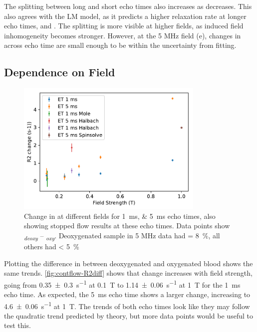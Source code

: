 The splitting between long and short echo times also increases as \SOtwo decreases.
This also agrees with the LM model, as it predicts a higher relaxation rate at longer echo times, and .
The splitting is more visible at higher fields, as induced field inhomogeneity becomes stronger.
However, at the 5 MHz field (e), changes in \Rtwo across echo time are small enough to be within the uncertainty from fitting.

\subsection{Dependence on Field}
\label{sec:contflow-fielddep}
\begin{figure}[ht]
\centering
\includegraphics[width=0.8\textwidth]{figures/contflow/R2fieldDep.pdf}
\caption[Change in \Rtwo at different fields]{Change in \Rtwo at different fields for \SIlist{1;5}{ms} echo times, also showing stopped flow results at these echo times. Data points show \Rtwo\textsubscript{\textit{deoxy}} -- \Rtwo\textsubscript{\textit{oxy}}. Deoxygenated sample in 5 MHz data had \SOtwo = \SI{8}{\percent}, all others had \SOtwo < \SI{5}{\percent}}
\label{fig:contflow-R2diff}
\end{figure}

Plotting the difference in \Rtwo between deoxygenated and oxygenated blood shows the same trends.
\autoref{fig:contflow-R2diff} shows that \Rtwo change increases with field strength, going from \SI{0.35\pm0.3}{s^{-1}} at \SI{0.1}{T} to \SI{1.14\pm0.06}{s^{-1}} at \SI{1}{T} for the \SI{1}{ms} echo time.
As expected, the \SI{5}{ms} echo time shows a larger \Rtwo change, increasing to \SI{4.6\pm0.06}{s^{-1}} at \SI{1}{T}.
The trends of both echo times look like they may follow the quadratic trend predicted by theory, but more data points would be useful to test this.

